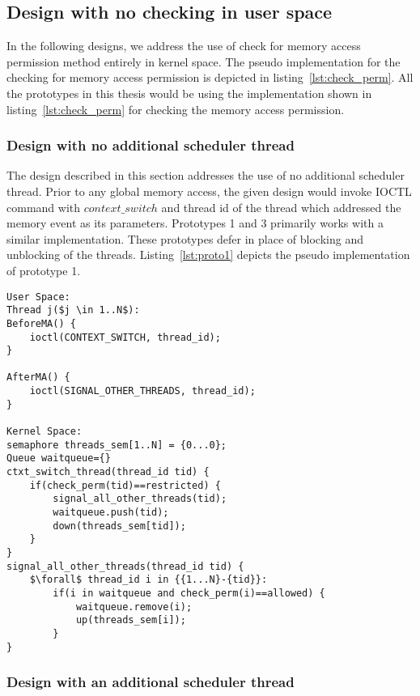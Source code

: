 \subsection{Design with no checking in user space \label{nocheck}}

In the following designs, we address the use of check for memory access  permission method entirely in kernel space. 
The pseudo implementation for the checking for memory access permission is depicted in listing~\ref{lst:check_perm}. 
All the prototypes in this thesis would be using the implementation shown in listing~\ref{lst:check_perm} for checking the memory access permission.

\subsubsection{Design with no additional scheduler thread} \label{no_check_no_add}

The design described in this section addresses the use of no additional scheduler thread. 
Prior to any global memory access, the given design would invoke IOCTL command with $context\_switch$ and thread id of the thread which addressed the memory event as its parameters. 
Prototypes 1 and 3 primarily works with a similar implementation. 
These prototypes defer in place of blocking and unblocking of the threads. 
Listing~\ref{lst:proto1} depicts the pseudo implementation of prototype 1.

\begin{lstlisting}[mathescape=true,caption={Pseudo Code for Prototype 1}, style=customc,frame=tlrb,label={lst:proto1}]
User Space:
Thread j($j \in 1..N$):
BeforeMA() {	
	ioctl(CONTEXT_SWITCH, thread_id);	
}

AfterMA() {	
	ioctl(SIGNAL_OTHER_THREADS, thread_id);
}

Kernel Space:
semaphore threads_sem[1..N] = {0...0};
Queue waitqueue={}
ctxt_switch_thread(thread_id tid) {	
	if(check_perm(tid)==restricted) {
		signal_all_other_threads(tid);
		waitqueue.push(tid);
		down(threads_sem[tid]); 
	}
}
signal_all_other_threads(thread_id tid) {
	$\forall$ thread_id i in {{1...N}-{tid}}:
		if(i in waitqueue and check_perm(i)==allowed) {
			waitqueue.remove(i);
			up(threads_sem[i]);
		}
}

\end{lstlisting}

\subsubsection{Design with an additional scheduler thread}\label{sec_add_thread}

